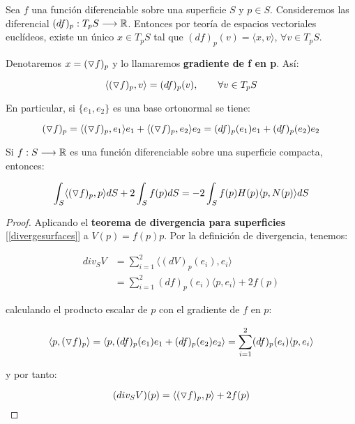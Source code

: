 \begin{definition}[Gradiente]
Sea $f$ una función diferenciable sobre una superficie $S$ y $p \in S$. Consideremos las diferencial $(df)_p: T_pS \longrightarrow \mathbb{R}$. Entonces por teoría de espacios vectoriales euclídeos, existe un único $x \in T_pS$ tal que $(df)_p(v)=  \langle x,v \rangle $, $\forall v \in T_pS$.

Denotaremos $x= (\triangledown f)_p $ y lo llamaremos \textbf{gradiente de f en p}. Así:

\begin{equation*}
    \langle (\triangledown f)_p, v \rangle = (df)_p(v), \qquad \forall v \in T_pS
\end{equation*}

En particular, si $\{e_1, e_2\}$ es una base ortonormal se tiene:

\begin{equation*}
     (\triangledown f)_p = \langle  (\triangledown f)_p , e_1 \rangle e_1 + \langle (\triangledown f)_p, e_2 \rangle e_2 = (df)_p(e_1)e_1 + (df)_p(e_2)e_2
\end{equation*}
\end{definition}

\begin{corolario}\label{corolariogradiente}
Si $f: S \longrightarrow \mathbb{R}$ es una función diferenciable sobre una superficie compacta, entonces:

\begin{equation*}
    \int_S \langle (\triangledown f)_p, p \rangle dS + 2 \int_S f(p)dS = -2 \int_S f(p)H(p) \langle p, N(p) \rangle dS
\end{equation*}
\end{corolario}
\begin{proof}
Aplicando el \textbf{teorema de divergencia para superficies} [\ref{divergesurfaces}] a $V(p)=f(p)p$. Por la definición de divergencia, tenemos:

\begin{align*}
    div_S V &= \sum_{i=1}^2 \langle (dV)_p(e_i), e_i \rangle \\
    &= \sum_{i=1}^2 (df)_p(e_i) \langle p, e_i \rangle + 2f(p)
\end{align*}

calculando el producto escalar de $p$ con el gradiente de $f$ en $p$:

\begin{equation*}
    \langle p, (\triangledown f)_p \rangle = \langle p, (df)_p(e_1)e_1 + (df)_p(e_2)e_2 \rangle = \sum_{i=1}^2 (df)_p(e_i) \langle p, e_i \rangle 
\end{equation*}

y por tanto:

\begin{equation*}
    (div_S V)(p) = \langle (\triangledown f)_p, p \rangle + 2f(p)
\end{equation*}
\end{proof}

